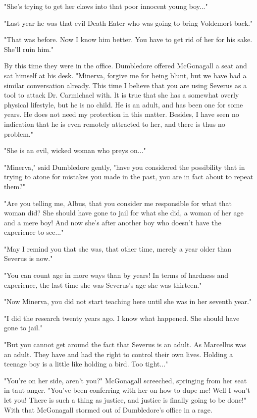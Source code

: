"She's trying to get her claws into that poor innocent young boy..."

"Last year he was that evil Death Eater who was going to bring Voldemort back."

"That was before. Now I know him better. You have to get rid of her for his sake. She'll ruin him."

By this time they were in the office. Dumbledore offered McGonagall a seat and sat himself at his desk. "Minerva, forgive me for being blunt, but we have had a similar conversation already. This time I believe that you are using Severus as a tool to attack Dr. Carmichael with. It is true that she has a somewhat overly physical lifestyle, but he is no child. He is an adult, and has been one for some years. He does not need my protection in this matter. Besides, I have seen no indication that he is even remotely attracted to her, and there is thus no problem."

"She is an evil, wicked woman who preys on..."

"Minerva," said Dumbledore gently, "have you considered the possibility that in trying to atone for mistakes you made in the past, you are in fact about to repeat them?"

"Are you telling me, Albus, that you consider me responsible for what that woman did? She should have gone to jail for what she did, a woman of her age and a mere boy! And now she's after another boy who doesn't have the experience to see..."

"May I remind you that she was, that other time, merely a year older than Severus is now."

"You can count age in more ways than by years! In terms of hardness and experience, the last time she was Severus's age she was thirteen."

"Now Minerva, you did not start teaching here until she was in her seventh year."

"I did the research twenty years ago. I know what happened. She should have gone to jail."

"But you cannot get around the fact that Severus is an adult. As Marcellus was an adult. They have and had the right to control their own lives. Holding a teenage boy is a little like holding a bird. Too tight..."

"You're on her side, aren't you?" McGonagall screeched, springing from her seat in taut anger. "You've been conferring with her on how to dupe me! Well I won't let you! There is such a thing as justice, and justice is finally going to be done!" With that McGonagall stormed out of Dumbledore's office in a rage.


